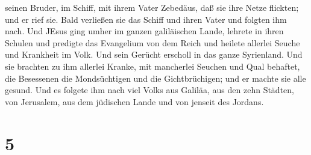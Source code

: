 seinen Bruder, im Schiff, mit ihrem Vater Zebedäus, daß sie ihre Netze
flickten; und er rief sie.  Bald verließen sie das Schiff
und ihren Vater und folgten ihm nach.  Und JEsus ging umher
im ganzen galiläischen Lande, lehrete in ihren Schulen und predigte das
Evangelium von dem Reich und heilete allerlei Seuche und Krankheit im
Volk.  Und sein Gerücht erscholl in das ganze Syrienland.
Und sie brachten zu ihm allerlei Kranke, mit mancherlei Seuchen und Qual
behaftet, die Besessenen die Mondsüchtigen und die Gichtbrüchigen; und
er machte sie alle gesund.  Und es folgete ihm nach viel
Volks aus Galiläa, aus den zehn Städten, von Jerusalem, aus dem
jüdischen Lande und von jenseit des Jordans.

\hypertarget{section-4}{%
\section{5}\label{section-4}}


